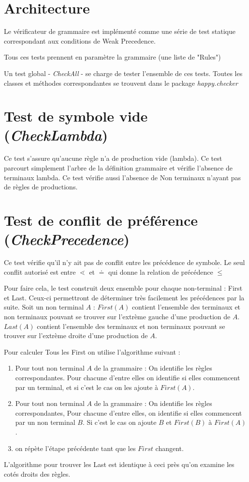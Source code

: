 	\section{Architecture}
	Le vérificateur de grammaire est implémenté comme une série de test
	statique correspondant aux conditions de Weak Precedence.
	
	Tous ces tests prennent en paramètre la grammaire (une liste de "Rules")

	Un test global - \emph{CheckAll} - se charge de tester l'ensemble de ces tests.
	Toutes les classes et méthodes correspondantes se trouvent dans le package \emph{happy.checker}

	\section{Test de symbole vide (\emph{CheckLambda})}
		Ce test s'assure qu'aucune règle n'a de production vide (lambda).
		Ce test parcourt simplement l'arbre de la définition grammaire et
		vérifie l'absence de terminaux lambda. Ce test vérifie aussi l'absence
		de Non terminaux n'ayant pas de règles de productions. 

	\section{Test de conflit de préférence (\emph{CheckPrecedence})}
		Ce test vérifie qu'il n'y ait pas de conflit entre les précédence
		de symbole. Le seul conflit autorisé est entre $\lessdot$ et $\doteq$ qui donne
		la relation de précédence $\dot{\leq}$

		Pour faire cela, le test construit deux ensemble pour chaque non-terminal :
		First et Last. Ceux-ci permettront de déterminer très facilement les précédences
		par la suite. Soit un non terminal $A$ : $First(A)$ contient l'ensemble des terminaux et non terminaux 
		pouvant se trouver sur l'extrème gauche d'une production de $A$. $Last(A)$ contient l'ensemble
		des terminaux et non terminaux pouvant se trouver sur l'extrème droite d'une production de $A$. 

		Pour calculer Tous les First on utilise l'algorithme suivant :
		\begin{enumerate}
			\item Pour tout non terminal $A$ de la grammaire : On identifie les règles correspondantes.
			Pour chacune d'entre elles on identifie si elles commencent par un terminal, et si
			c'est le cas on les ajoute à $First(A)$. 
			\item Pour tout non terminal $A$ de la grammaire : On identifie les règles correspondantes,
			Pour chacune d'entre elles, on identifie si elles commencent par un non terminal $B$.
			Si c'est le cas on ajoute $B$ et $First(B)$ à $First(A)$. 
			\item on répète l'étape précédente tant que les $First$ changent.
		\end{enumerate}
		L'algorithme pour trouver les Last est identique à ceci près qu'on examine les cotés droits des règles.
		
